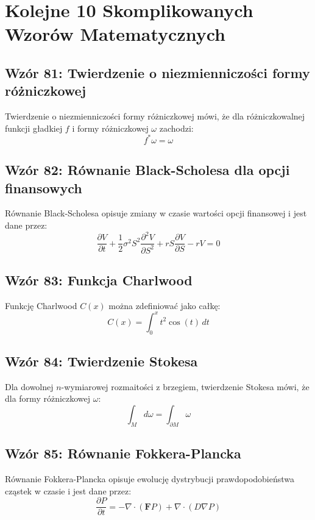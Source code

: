 \documentclass{article}
\begin{document}
\section*{Kolejne 10 Skomplikowanych Wzorów Matematycznych}

\subsection*{Wzór 81: Twierdzenie o niezmienniczości formy różniczkowej}

Twierdzenie o niezmienniczości formy różniczkowej mówi, że dla różniczkowalnej funkcji gładkiej \(f\) i formy różniczkowej \(\omega\) zachodzi:
\[ f^*\omega = \omega \]

\subsection*{Wzór 82: Równanie Black-Scholesa dla opcji finansowych}

Równanie Black-Scholesa opisuje zmiany w czasie wartości opcji finansowej i jest dane przez:
\[ \frac{\partial V}{\partial t} + \frac{1}{2}\sigma^2 S^2 \frac{\partial^2 V}{\partial S^2} + rS \frac{\partial V}{\partial S} - rV = 0 \]

\subsection*{Wzór 83: Funkcja Charlwood}

Funkcję Charlwood \(C(x)\) można zdefiniować jako całkę:
\[ C(x) = \int_{0}^{x} t^2\cos(t) \, dt \]

\subsection*{Wzór 84: Twierdzenie Stokesa}

Dla dowolnej \(n\)-wymiarowej rozmaitości z brzegiem, twierdzenie Stokesa mówi, że dla formy różniczkowej \(\omega\):
\[ \int_{M} d\omega = \int_{\partial M} \omega \]

\subsection*{Wzór 85: Równanie Fokkera-Plancka}

Równanie Fokkera-Plancka opisuje ewolucję dystrybucji prawdopodobieństwa cząstek w czasie i jest dane przez:
\[ \frac{\partial P}{\partial t} = -\nabla \cdot (\mathbf{F}P) + \nabla \cdot (D\nabla P) \]
\end{document}
